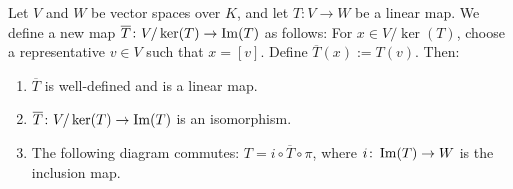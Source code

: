 \begin{theorem}
  \label{thm:first_isomorphism}
  Let $V$ and $W$ be vector spaces over $K$, and let $T \colon V \to W$ be a linear map. We define a new map $\overline{T} \colon V/\ker(T) \to \operatorname{Im}(T)$ as follows: For $x \in V/\ker(T)$, choose a representative $v \in V$ such that $x = [v]$. Define $\overline{T}(x) := T(v)$. Then:
  \begin{enumerate}
    \item $\overline{T}$ is well-defined and is a linear map.
    \item $\overline{T} \colon V/\ker(T) \to \operatorname{Im}(T)$ is an isomorphism.
    \item {The following diagram commutes: $T = i \circ \overline{T} \circ \pi$, where $i \colon \operatorname{Im}(T) \to W$ is the inclusion map.
      \begin{center}
      \end{center}
    }

  \end{enumerate}
\end{theorem}


